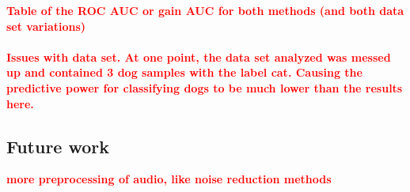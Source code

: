 \documentclass[a4paper]{article}
\newcommand\red[1]{\textcolor{red}{\textbf{#1}}}
\begin{document}
\red{Table of the ROC AUC or gain AUC for both methods (and both data set variations)}
\\\\
\red{Issues with data set. At one point, the data set analyzed was messed up and contained 3 dog samples with the label cat. Causing the predictive power for classifying dogs to be much lower than the results here.}
\subsection{Future work} \label{sec:future}
\red{more preprocessing of audio, like noise reduction methods}

\end{document}
